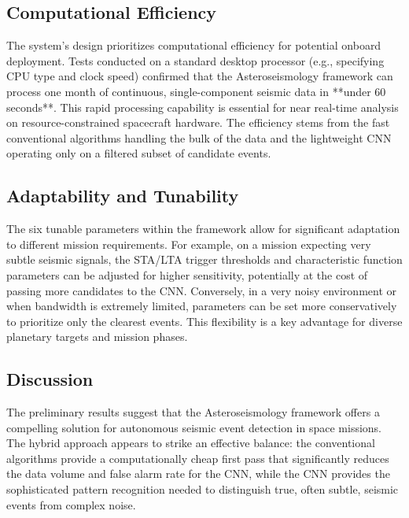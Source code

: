 \documentclass[conference]{IEEEtran}
\begin{document}

\subsection{Computational Efficiency}
The system's design prioritizes computational efficiency for potential onboard deployment. Tests conducted on a standard desktop processor (e.g., specifying CPU type and clock speed) confirmed that the Asteroseismology framework can process one month of continuous, single-component seismic data in **under 60 seconds**. This rapid processing capability is essential for near real-time analysis on resource-constrained spacecraft hardware. The efficiency stems from the fast conventional algorithms handling the bulk of the data and the lightweight CNN operating only on a filtered subset of candidate events.

\subsection{Adaptability and Tunability}
The six tunable parameters within the framework allow for significant adaptation to different mission requirements. For example, on a mission expecting very subtle seismic signals, the STA/LTA trigger thresholds and characteristic function parameters can be adjusted for higher sensitivity, potentially at the cost of passing more candidates to the CNN. Conversely, in a very noisy environment or when bandwidth is extremely limited, parameters can be set more conservatively to prioritize only the clearest events. This flexibility is a key advantage for diverse planetary targets and mission phases.

\subsection{Discussion}
The preliminary results suggest that the Asteroseismology framework offers a compelling solution for autonomous seismic event detection in space missions. The hybrid approach appears to strike an effective balance: the conventional algorithms provide a computationally cheap first pass that significantly reduces the data volume and false alarm rate for the CNN, while the CNN provides the sophisticated pattern recognition needed to distinguish true, often subtle, seismic events from complex noise.
\end{document}
